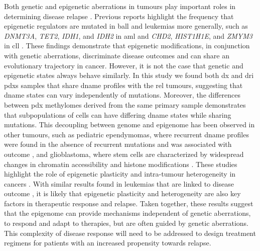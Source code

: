 Both genetic and epigenetic aberrations in tumours play important roles in determining disease relapse \cite{nordlundGenomewideSignaturesDifferential2013,leeEpigeneticRemodelingBcell2015}.
Previous reports highlight the frequency that epigenetic regulators are mutated in \gls{ball} \cite{maRiseFallSubclones2015} and leukemias more generally, such as \emph{DNMT3A}, \emph{TET2}, \emph{IDH1}, and \emph{IDH2} in \gls{aml} \cite{kishtagariDriverMutationsAcute2020,papaemmanuilGenomicClassificationPrognosis2016,leyDNMT3AMutationsAcute2010} and \emph{CHD2}, \emph{HIST1H1E}, and \emph{ZMYM3} in \gls{cll} \cite{billotDeregulationAiolosExpression2011,landauChronicLymphocyticLeukemia2013,landauEvolutionImpactSubclonal2013}.
These findings demonstrate that epigenetic modifications, in conjunction with genetic aberrations, discriminate disease outcomes and can share an evolutionary trajectory in cancer.
However, it is not the case that genetic and epigenetic states always behave similarly.
In this study we found both \gls{dx} and \gls{dri} \glspl{pdx} samples that share \gls{dname} profiles with the \gls{rel} tumours, suggesting that \gls{dname} states can vary independently of mutations.
Moreover, the differences between \gls{pdx} methylomes derived from the same primary sample demonstrates that subpopulations of cells can have differing \gls{dname} states while sharing mutations.
This decoupling between genome and epigenome has been observed in other tumours, such as pediatric ependymomas, where recurrent \gls{dname} profiles were found in the absence of recurrent mutations and was associated with outcome \cite{mackEpigenomicAlterationsDefine2014,pajtlerMolecularClassificationEpendymal2015}, and glioblastoma, where stem cells are characterized by widespread changes in chromatin accessibility \cite{guilhamonSinglecellChromatinAccessibility2021} and histone modifications \cite{liauAdaptiveChromatinRemodeling2017}.
These studies highlight the role of epigenetic plasticity and intra-tumour heterogeneity in cancers \cite{flavahanEpigeneticPlasticityHallmarks2017}.
With similar results found in leukemias that are linked to disease outcome \cite{pastoreCorruptedCoordinationEpigenetic2019,landauLocallyDisorderedMethylation2014,gaitiEpigeneticEvolutionLineage2019,namIntegratingGeneticNongenetic2021,liDistinctEvolutionDynamics2016}, it is likely that epigenetic plasticity and heterogeneity are also key factors in therapeutic response and relapse.
Taken together, these results suggest that the epigenome can provide mechanisms independent of genetic aberrations, to respond and adapt to therapies, but are often guided by genetic aberrations.
This complexity of disease response will need to be addressed to design treatment regimens for patients with an increased propensity towards relapse.


